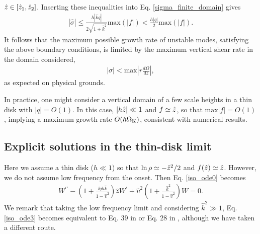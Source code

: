 $\hat{z}\in[\hat{z}_1,\hat{z}_2]$. Inserting these inequalities into
Eq. \ref{sigma_finite_domain} gives
\begin{align}\label{max_growth}
  |\hat{\sigma}|\leq
  \frac{h |\hat{k} q|}{2\sqrt{1+\hat{k}^2}}\mathrm{max}(|f|) < \frac{h |q|}{2}\mathrm{max}(|f|) . 
\end{align}
It
follows that the maximum possible growth rate of unstable modes,
satisfying the above boundary conditions, is limited by the maximum
vertical shear rate in the domain considered,
\begin{align}
  |\sigma| < \mathrm{max} \left|r\frac{d\Omega}{dz}\right|, 
\end{align}
as expected on physical grounds. %

In practice, one might consider a vertical domain of a few scale 
heights in a thin disk with $|q|=O(1)$. In this case, $|h\hat{z}|\ll1$ and  
$f\simeq \hat{z}$, so that $\mathrm{max}|f| = O(1)$, implying a
maximum growth rate $O(h \Omega_{\rm K})$, consistent with numerical
results. 

\subsection{Explicit solutions in the thin-disk limit}\label{iso_explicit}
Here we assume a thin disk ($h\ll1$) so that $\ln\rho\simeq
-\hat{z}^2/2$ and $f(\hat{z})\simeq \hat{z}$. However, we do not assume 
low frequency from the onset. Then Eq. \ref{iso_ode0} becomes 
\begin{align}\label{iso_ode3}
  W^{\prime\prime} - \left(1 + \frac{\ii qh \hat{k}}{1-\hat{\upsilon}^2}\right)\hat{z}W^\prime  +
  \hat{\upsilon}^2\left(1+\frac{\hat{k}^2}{1-\hat{\upsilon}^2}\right)W = 0.
\end{align}
We remark that taking the low frequency limit and considering
$\hat{k}^2\gg 1$, Eq. \ref{iso_ode3} becomes equivalent to Eq. 39 in
 or Eq. 28 in , although we have taken a
different route.    
 

